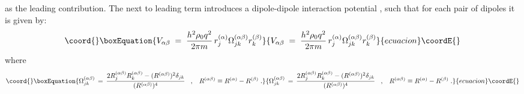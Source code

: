 \documentclass[a4paper,12pt]{article} \tolerance=200
\begin{document}
as the leading contribution. The next to leading term introduces a
dipole-dipole interaction potential \coordHE{}, such that for each pair
\myHighlight{$\alpha,\beta$}\coordHE{} of dipoles it is given by:
\begin{equation}\coord{}\boxEquation{
V_{\alpha\beta}\;=\; \frac{h^2\rho_0 q^2}{2 \pi m}\, r_j^{(\alpha)} \Omega^{(\alpha\beta)}_{jk} r_k^{(\beta)}
}{
V_{\alpha\beta}\;=\; \frac{h^2\rho_0 q^2}{2 \pi m}\, r_j^{(\alpha)} \Omega^{(\alpha\beta)}_{jk} r_k^{(\beta)}
}{ecuacion}\coordE{}\end{equation}
where
\begin{equation}\coord{}\boxEquation{
\Omega^{(\alpha\beta)}_{jk}\,=\, \frac{2 R^{(\alpha\beta)}_j  R^{(\alpha\beta)}_k - (R^{(\alpha\beta)})^2 \delta_{jk} }{(R^{(\alpha\beta)})^4}\;\;\;,
\;\;\; R^{(\alpha\beta)} \equiv R^{(\alpha)}-R^{(\beta)}\;. 
}{
\Omega^{(\alpha\beta)}_{jk}\,=\, \frac{2 R^{(\alpha\beta)}_j  R^{(\alpha\beta)}_k - (R^{(\alpha\beta)})^2 \delta_{jk} }{(R^{(\alpha\beta)})^4}\;\;\;,
\;\;\; R^{(\alpha\beta)} \equiv R^{(\alpha)}-R^{(\beta)}\;. 
}{ecuacion}\coordE{}\end{equation}
\end{document}
